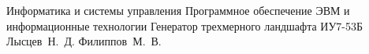 \documentclass{bmstu}
\begin{document}
\makecourseworktitle
{Информатика и системы управления}
{Программное обеспечение ЭВМ и информационные технологии}
{Генератор трехмерного ландшафта}
{ИУ7-53Б}
{Лысцев~Н.~Д.}
{Филиппов~М.~В.}
{}
{}

\setcounter{page}{3}

\maketableofcontents

%
%







\makebibliography


\end{document}
